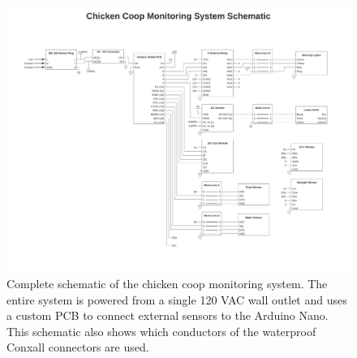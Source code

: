 \documentclass{article}
\begin{document}
\begin{figure}[H]
    \centering
    \includegraphics[width=\textwidth]{fig/schematic.pdf}
    \caption{Complete schematic of the chicken coop monitoring system.  The entire system is powered from a single 120 VAC wall outlet and uses a custom PCB to connect external sensors to the Arduino Nano.  This schematic also shows which conductors of the waterproof Conxall connectors are used.}
    \label{fig:schematic}
\end{figure}
\end{document}
